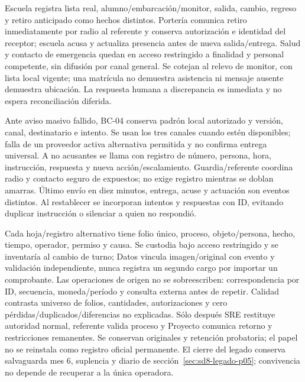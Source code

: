 Escuela registra lista real, alumno/embarcación/monitor, salida, cambio, regreso y retiro anticipado como hechos distintos. Portería comunica retiro inmediatamente por radio al referente y conserva autorización e identidad del receptor; escuela acusa y actualiza presencia antes de nueva salida/entrega. Salud y contacto de emergencia quedan en acceso restringido a finalidad y personal competente, sin difusión por canal general. Se cotejan al relevo de monitor, con lista local vigente; una matrícula no demuestra asistencia ni mensaje ausente demuestra ubicación. La respuesta humana a discrepancia es inmediata y no espera reconciliación diferida. \parencite[decisiones 6--8; restricción 14]{sd8-c07}

Ante aviso masivo fallido, BC-04 conserva padrón local autorizado y versión, canal, destinatario e intento. Se usan los tres canales cuando estén disponibles; falla de un proveedor activa alternativa permitida y no confirma entrega universal. A no acusantes se llama con registro de número, persona, hora, instrucción, respuesta y nueva acción/escalamiento. Guardia/referente coordina radio y contacto seguro de expuestos; no exige registro mientras se doblan amarras. Último envío en diez minutos, entrega, acuse y actuación son eventos distintos. Al restablecer se incorporan intentos y respuestas con ID, evitando duplicar instrucción o silenciar a quien no respondió. \parencite[RT-16.21; restricciones 1 y 4]{sd8-c07}

Cada hoja/registro alternativo tiene folio único, proceso, objeto/persona, hecho, tiempo, operador, permiso y causa. Se custodia bajo acceso restringido y se inventaría al cambio de turno; Datos vincula imagen/original con evento y validación independiente, nunca registra un segundo cargo por importar un comprobante. Las operaciones de origen no se sobreescriben: correspondencia por ID, secuencia, moneda/período y consulta externa antes de repetir. Calidad contrasta universo de folios, cantidades, autorizaciones y cero pérdidas/duplicados/diferencias no explicadas. Sólo después SRE restituye autoridad normal, referente valida proceso y Proyecto comunica retorno y restricciones remanentes. Se conservan originales y retención probatoria; el papel no se reinstala como registro oficial permanente. El cierre del legado conserva salvaguarda mes 6, suplencia y diario de sección~\ref{sec:sd8-legado-p05}; convivencia no depende de recuperar a la única operadora.

